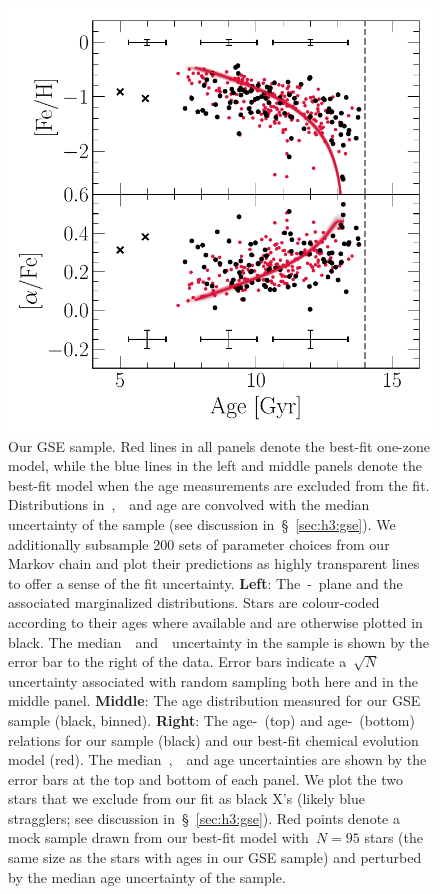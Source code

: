 \documentclass[ms.tex]{subfiles}
\begin{document}
\begin{figure}
\includegraphics[scale = 0.41]{gsefit_amr.pdf}
\caption{
Our GSE sample.
Red lines in all panels denote the best-fit one-zone model, while the
blue lines in the left and middle panels denote the best-fit model when the
age measurements are excluded from the fit.
Distributions in~\feh,~\afe~and age are convolved with the median uncertainty
of the sample (see discussion in~\S~\ref{sec:h3:gse}).
We additionally subsample 200 sets of parameter choices from our Markov chain
and plot their predictions as highly transparent lines to offer a sense of the
fit uncertainty.
\textbf{Left}: The~\afe-\feh~plane and the associated marginalized
distributions.
Stars are colour-coded according to their ages where available and are
otherwise plotted in black.
The median~\feh~and~\afe~uncertainty in the sample is shown by the error bar
to the right of the data.
Error bars indicate a~$\sqrt{N}$ uncertainty associated with random
sampling both here and in the middle panel.
\textbf{Middle}: The age distribution measured for our GSE sample (black,
binned).
\textbf{Right}: The age-\feh~(top) and age-\afe~(bottom) relations for our
sample (black) and our best-fit chemical evolution model (red).
The median~\feh,~\afe~and age uncertainties are shown by the error bars at the
top and bottom of each panel.
We plot the two stars that we exclude from our fit as black X's (likely
blue stragglers; see discussion in~\S~\ref{sec:h3:gse}).
Red points denote a mock sample drawn from our best-fit model with~$N = 95$
stars (the same size as the stars with ages in our GSE sample) and perturbed by
the median age uncertainty of the sample.
}
\label{fig:gse}
\end{figure}
\end{document}
